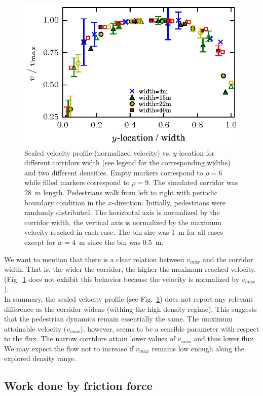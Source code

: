 \documentclass[preprint,12pt]{elsarticle}
\begin{document}
\begin{figure}[htbp!]
\centering
\includegraphics[width=0.7\columnwidth]
{./v_y_multi_width_normaliz.eps}
\caption{\label{speed-profile-width-normaliz} Scaled velocity profile (normalized velocity) vs. $y$-location for different corridors width (see legend for the corresponding widths) and two different densities. Empty markers correspond to $\rho=6$ while filled markers correspond to  $\rho=9$. The simulated corridor was 28~m length. Pedestrians walk from left to right with periodic boundary condition in the $x$-direction. Initially, pedestrians were randomly distributed. The horizontal axis is normalized by the corridor width, the vertical axis is normalized by the maximum velocity reached in each case.  The bin size was 1~m for all cases except for $w=4$~m since the bin was 0.5~m.}
\end{figure}

We want to mention that there is a clear relation between $v_{max}$ and the corridor width. That is, the wider the corridor, the higher the maximum reached velocity. (Fig.~\ref{speed-profile-width-normaliz} does not exhibit this behavior because the velocity is normalized by $v_{max}$).\\

In summary, the scaled velocity profile (see Fig.~\ref{speed-profile-width-normaliz}) does not report any relevant difference as the corridor widens (withing the high density regime). This suggests that the pedestrian dynamics remain essentially the same. The maximum attainable velocity ($v_{max}$), however, seems to be a sensible parameter with respect to the flux.  The narrow corridors attain lower values of $v_{max}$ and thus lower flux. We may expect the flow not to increase if $v_{max}$ remains low enough along the explored density range.\\

\subsection{Work done by friction force}
\end{document}
